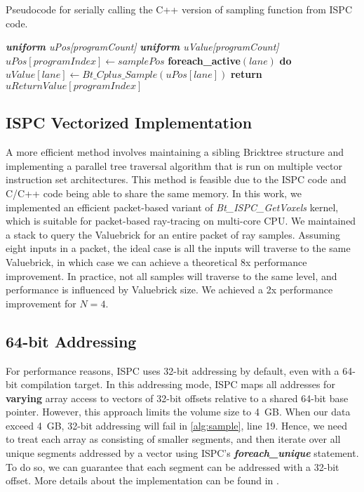 \begin{algorithm}
	\caption{Pseudocode for serially calling the C++ version of sampling function from ISPC code. }\label{alg:ispc_sample}
	\begin{algorithmic}[1]
        	\State \textit{\textbf{uniform} uPos[programCount]}
            \State \textit{\textbf{uniform} uValue[programCount]}
            \State $uPos[programIndex] \gets samplePos$
            \State \textbf{foreach\_active}$(lane)$ \textbf{do}
            	\State \ \ \ \ $uValue[lane] \gets Bt\_Cplus\_Sample(uPos[lane])$
            \State \textbf{return} $uReturnValue[programIndex]$           
    	\EndProcedure
	\end{algorithmic}
\end{algorithm}


\subsection{ISPC Vectorized Implementation}
A more efficient method involves maintaining a sibling Bricktree structure and 
implementing a parallel tree traversal algorithm that is run on multiple vector
instruction set architectures.
This method is feasible due to the ISPC code and C/C++ code being able to share the same memory.
In this work, we implemented an efficient packet-based variant of 
\textit{Bt\_ISPC\_GetVoxels} kernel, which is suitable for packet-based ray-tracing
on multi-core CPU. We maintained a stack to query the Valuebrick for an entire
packet of ray samples. Assuming eight inputs in a packet, the ideal case is all the inputs will
traverse to the same Valuebrick, in which case we can achieve a theoretical 8x performance
improvement. In practice, not all samples will traverse to the same level,
and performance is influenced by Valuebrick size. We achieved a 2x performance
improvement for $N=4$.


\subsection{64-bit Addressing} 
For performance reasons, ISPC uses 32-bit addressing by default, even with
a 64-bit compilation target. In this addressing mode, ISPC maps all addresses for
\textbf{varying} array access to vectors of 32-bit offsets relative to a shared
64-bit base pointer. However, this approach limits the volume size to 4~GB.
When our data exceed 4~GB, 32-bit addressing will fail in \cref{alg:sample},
line 19. Hence, we need to treat each array as consisting of smaller
segments, and then iterate over all unique segments addressed by a vector using
ISPC's \textbf{\textit{foreach\_unique}} statement. To do so, we can guarantee 
that each segment can be addressed with a 32-bit offset. More details about
the implementation can be found in \cite{wald_2018}. 

